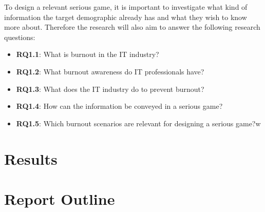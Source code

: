To design a relevant serious game, it is important to investigate what kind of information the target demographic already has and what they wish to know more about. Therefore the research will also aim to answer the following research questions:

\begin{itemize}
    \item[] \textbf{RQ1.1}: What is burnout in the IT industry?
    \item[] \textbf{RQ1.2}: What burnout awareness do IT professionals have?
    \item[] \textbf{RQ1.3}: What does the IT industry do to prevent burnout?
    \item[] \textbf{RQ1.4}: How can the information be conveyed in a serious game?
    \item[] \textbf{RQ1.5}: Which burnout scenarios are relevant for designing a serious game?w
\end{itemize}


\section{Results}

\section{Report Outline}

